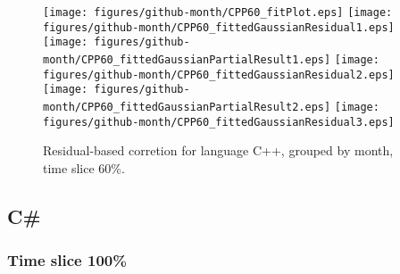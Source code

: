 \begin{figure}[hb]
\centering
{}
{\texttt{[image: figures/github-month/CPP60\_fitPlot.eps]}}
{\texttt{[image: figures/github-month/CPP60\_fittedGaussianResidual1.eps]}}
{\texttt{[image: figures/github-month/CPP60\_fittedGaussianPartialResult1.eps]}}
{\texttt{[image: figures/github-month/CPP60\_fittedGaussianResidual2.eps]}}
{\texttt{[image: figures/github-month/CPP60\_fittedGaussianPartialResult2.eps]}}
{\texttt{[image: figures/github-month/CPP60\_fittedGaussianResidual3.eps]}}
\caption{Residual-based corretion for language C++, grouped by month, time slice 60\%.}
\end{figure}


\clearpage 
\newpage 


\subsection{C\#}

\FloatBarrier

\subsubsection{Time slice 100\%}

